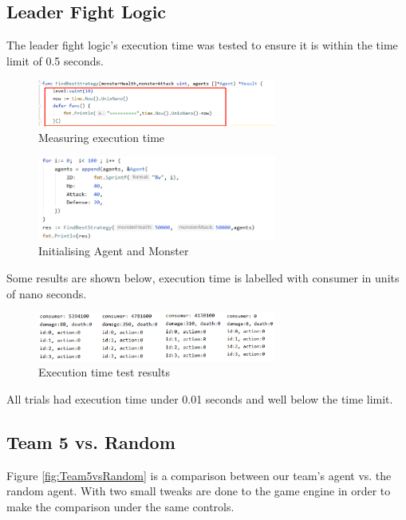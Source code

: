 \subsection{Leader Fight Logic}
The leader fight logic's execution time was tested to ensure it is within the time limit of 0.5 seconds.

\begin{figure}[htb]
    \centering
    \includegraphics[width=0.7\textwidth]{008_team_5_agent_design/images/10.png}
    \caption{Measuring execution time}
    \label{testingexecutiontime}
\end{figure}

\begin{figure}[!ht]
    \centering
    \includegraphics[width=0.7\textwidth]{008_team_5_agent_design/images/11.png}
    \caption{Initialising Agent and Monster}
    \label{initialisingagentandmonster}
\end{figure}

Some results are shown below, execution time is labelled with consumer in units of nano seconds.

\begin{figure}[!ht]
    \centering
    \includegraphics[width=0.7\textwidth]{008_team_5_agent_design/images/12.png}
    \caption{Execution time test results}
    \label{executiontimetestresults}
\end{figure}

All trials had execution time under 0.01 seconds and well below the time limit.

\subsection{Team 5 vs. Random}
Figure \ref{fig:Team5vsRandom} is a comparison between our team's agent vs. the random agent. With two small tweaks are done to the game engine in order to make the comparison under the same controls.


